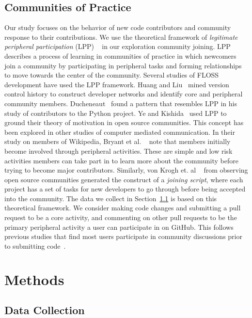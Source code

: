 \documentclass{sigchi}
\begin{document}
\subsection{Communities of Practice} \label{sec:communities}
Our study focuses on the behavior of new code contributors and community
response to their contributions. We use the theoretical framework of
\textit{legitimate peripheral participation} (LPP) ~\cite{lave_situated_1991} in
our exploration community joining. LPP describes a process of learning in
communities of practice in which newcomers join a community by participating in
peripheral tasks and forming relationships to move towards the center of the
community. Several studies of FLOSS development have used the LPP framework.
Huang and Liu~\cite{huang_mining_2005} mined version control history to
construct developer networks and identify core and peripheral community members.
Ducheneaut~\cite{ducheneaut_socialization_2005} found a pattern that resembles
LPP in his study of contributors to the Python project. Ye and
Kishida~\cite{ye_toward_2003} used LPP to ground their theory of motivation in
open source communities. This concept has been explored in other studies of
computer mediated communication.  In their study on members of Wikipedia, Bryant
et al. ~\cite{bryant_becoming_2005} note that members initially become involved
through peripheral activities. These are simple and low risk activities members
can take part in to learn more about the community before trying to become major
contributors. Similarly, von Krogh et. al ~\cite{von_krogh_community_2003} from
observing open source communities generated the construct of a \textit{joining
script}, where each project has a set of tasks for new developers to go through
before being accepted into the community.  The data we collect in
Section~\ref{sec:datacollection} is based on this theoretical framework. We
consider making code changes and submitting a pull request to be a core
activity, and commenting on other pull requests to be the primary peripheral
activity a user can participate in on GitHub. This follows previous studies that
find most users participate in community discussions prior to submitting
code~\cite{ducheneaut_socialization_2005, von_krogh_community_2003}.

\section{Methods} \label{chap:methods}


\subsection{Data Collection} \label{sec:datacollection}
\end{document}
